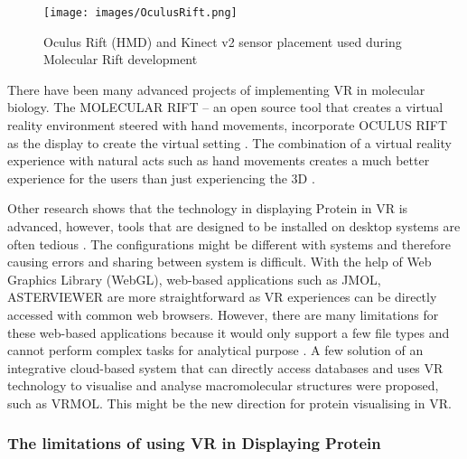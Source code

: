 \begin{figure}[!htp]
	\centering
	\texttt{[image: images/OculusRift.png]}
	\caption{Oculus Rift (HMD) and Kinect v2 sensor placement used during Molecular Rift development}
	\label{fig:OculusRift}
\end{figure}


There have been many advanced projects of implementing VR in molecular biology. The {\footnotesize MOLECULAR RIFT} – an open source tool that creates a virtual reality environment steered with hand movements, incorporate {\footnotesize OCULUS RIFT} as the display to create the virtual setting \parencite{norrby_molecular_2015}. The combination of a virtual reality experience with natural acts such as hand movements creates a much better experience for the users than just experiencing the 3D \parencite{norrby_molecular_2015}.

Other research shows that the technology in displaying Protein in VR is advanced, however, tools that are designed to be installed on desktop systems are often tedious \parencite{xu_vrmol_2019}.  The configurations might be different with systems and therefore causing errors and sharing between system is difficult. With the help of Web Graphics Library (WebGL), web-based applications such as {\footnotesize JMOL}, {\footnotesize ASTERVIEWER} are more straightforward as VR experiences can be directly accessed with common web browsers. However, there are many limitations for these web-based applications because it would only support a few file types and cannot perform complex tasks for analytical purpose \parencite{xu_vrmol_2019}. A few solution of an integrative cloud-based system that can directly access databases and uses VR technology to visualise and analyse macromolecular structures were proposed, such as {\footnotesize VRMOL}. This might be the new direction for protein visualising in VR.

\subsubsection{The limitations of using VR in Displaying Protein}

